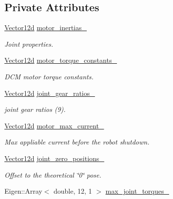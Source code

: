 \subsection*{Private Attributes}
\begin{DoxyCompactItemize}
\item 
\hyperlink{common__header_8hpp_a80313eb420184518596e745eecf4b494}{Vector12d} \hyperlink{classblmc__robots_1_1Solo12_a625a9e4fe0be2fcad91a670d12f18bf3}{motor\+\_\+inertias\+\_\+}
\begin{DoxyCompactList}\small\item\em Joint properties. \end{DoxyCompactList}\item 
\hyperlink{common__header_8hpp_a80313eb420184518596e745eecf4b494}{Vector12d} \hyperlink{classblmc__robots_1_1Solo12_a4bab49dbf3f7234b6e0d5166696c885a}{motor\+\_\+torque\+\_\+constants\+\_\+}
\begin{DoxyCompactList}\small\item\em D\+CM motor torque constants. \end{DoxyCompactList}\item 
\hyperlink{common__header_8hpp_a80313eb420184518596e745eecf4b494}{Vector12d} \hyperlink{classblmc__robots_1_1Solo12_a03d025b7fa51624e1de5865340429b9f}{joint\+\_\+gear\+\_\+ratios\+\_\+}
\begin{DoxyCompactList}\small\item\em joint gear ratios (9). \end{DoxyCompactList}\item 
\hyperlink{common__header_8hpp_a80313eb420184518596e745eecf4b494}{Vector12d} \hyperlink{classblmc__robots_1_1Solo12_a46cab41a223dc4ee824e6d192cc01f9d}{motor\+\_\+max\+\_\+current\+\_\+}
\begin{DoxyCompactList}\small\item\em Max appliable current before the robot shutdown. \end{DoxyCompactList}\item 
\hyperlink{common__header_8hpp_a80313eb420184518596e745eecf4b494}{Vector12d} \hyperlink{classblmc__robots_1_1Solo12_ad3d4f55c1a8d5c16aaacf5e870370f18}{joint\+\_\+zero\+\_\+positions\+\_\+}
\begin{DoxyCompactList}\small\item\em Offset to the theoretical \char`\"{}0\char`\"{} pose. \end{DoxyCompactList}\item 
Eigen\+::\+Array$<$ double, 12, 1 $>$ \hyperlink{classblmc__robots_1_1Solo12_a8eab2e983bfe76eafbcf054c385340a3}{max\+\_\+joint\+\_\+torques\+\_\+}\hypertarget{classblmc__robots_1_1Solo12_a8eab2e983bfe76eafbcf054c385340a3}{}\label{classblmc__robots_1_1Solo12_a8eab2e983bfe76eafbcf054c385340a3}


\end{DoxyCompactItemize}
